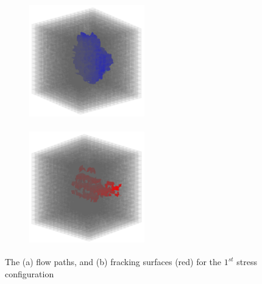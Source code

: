 \begin{figure}[!ht]
\begin{subfigure}[c]{0.48\textwidth}
\centering
\includegraphics[width=5cm,height=5cm]{figures/Amir_ME2_B_Flow_a.png}
\subcaption{}
\label{fig:Amir_ME2_B_Flow_a}
\end{subfigure}
\hfill
\begin{subfigure}[c]{0.48\textwidth}
\centering
\includegraphics[width=5cm,height=5cm]{figures/Amir_ME2_B_Fracture_a.png}
\subcaption{}
\label{fig:Amir_ME2_B_Fracture_a}
\end{subfigure}
\caption{The (a) flow paths, and (b) fracking surfaces (red) for the $1^{st}$ stress configuration}
\end{figure}


